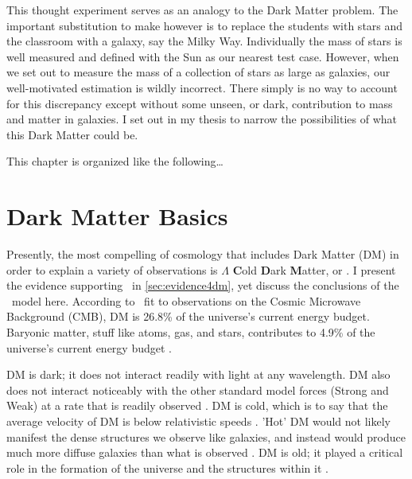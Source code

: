 This thought experiment serves as an analogy to the Dark Matter problem.
The important substitution to make however is to replace the students with stars and the classroom with a galaxy, say the Milky Way.
Individually the mass of stars is well measured and defined with the Sun as our nearest test case.
However, when we set out to measure the mass of a collection of stars as large as galaxies, our well-motivated estimation is wildly incorrect.
There simply is no way to account for this discrepancy except without some unseen, or dark, contribution to mass and matter in galaxies.
I set out in my thesis to narrow the possibilities of what this Dark Matter could be.

This chapter is organized like the following\dots
{}

\section{Dark Matter Basics\label{sec:basicDM}}

Presently, the most compelling of cosmology that includes Dark Matter (DM) in order to explain a variety of observations is $\Lambda$ \textbf{C}old \textbf{D}ark \textbf{M}atter, or \lcdm.
I present the evidence supporting \lcdm~in \ref{sec:evidence4dm}, yet discuss the conclusions of the \lcdm~model here.
According to \lcdm~fit to observations on the Cosmic Microwave Background (CMB), DM is 26.8\% of the universe's current energy budget.
Baryonic matter, stuff like atoms, gas, and stars, contributes to 4.9\% of the universe's current energy budget \cite{Greene:cosmology_dm,Young:cosmology_dm,Bertone:particleDM}.


DM is dark; it does not interact readily with light at any wavelength.
DM also does not interact noticeably with the other standard model forces (Strong and Weak) at a rate that is readily observed \cite{Bertone:particleDM}.
DM is cold, which is to say that the average velocity of DM is below relativistic speeds \cite{Greene:cosmology_dm}.
'Hot' DM would not likely manifest the dense structures we observe like galaxies, and instead would produce much more diffuse galaxies than what is observed \cite{Bertone:particleDM,Greene:cosmology_dm}.
DM is old; it played a critical role in the formation of the universe and the structures within it \cite{Greene:cosmology_dm,Young:cosmology_dm}.

